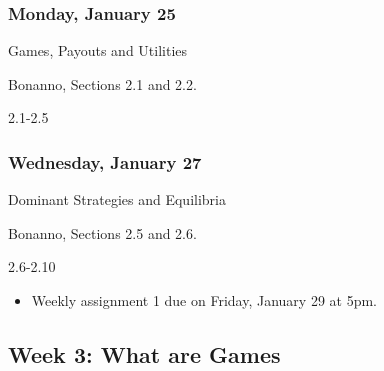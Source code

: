 \documentclass[
]{article}
\providecommand{\tightlist}{%
  \setlength{\itemsep}{0pt}\setlength{\parskip}{0pt}}
\begin{document}
\begin{multicols}{2}

\hypertarget{monday-january-25}{%
\subsubsection{Monday, January 25}\label{monday-january-25}}

\begin{description}
\tightlist
\item[Topic]
Games, Payouts and Utilities
\item[Reading]
Bonanno, Sections 2.1 and 2.2.
\item[Lectures]
2.1-2.5
\end{description}

\hypertarget{wednesday-january-27}{%
\subsubsection{Wednesday, January 27}\label{wednesday-january-27}}

\begin{description}
\tightlist
\item[Topic]
Dominant Strategies and Equilibria
\item[Reading]
Bonanno, Sections 2.5 and 2.6.
\item[Lectures]
2.6-2.10
\end{description}

\end{multicols}

\begin{itemize}
\tightlist
\item
  Weekly assignment 1 due on Friday, January 29 at 5pm.
\end{itemize}

\hypertarget{week-3-what-are-games}{%
\subsection{Week 3: What are Games}\label{week-3-what-are-games}}
\end{document}
